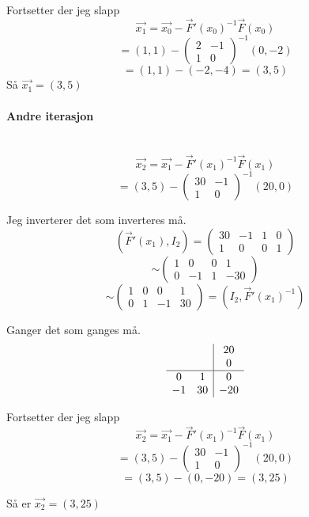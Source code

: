 Fortsetter der jeg slapp
$$\vec{x_1} = \vec{x_0} - \vec{F}'(x_0)^{-1}\vec{F}(x_0)$$
$$ = (1,1) - \begin{pmatrix}2&-1\\1&0\end{pmatrix}^{-1} (0,-2)$$
$$ = (1,1) - (-2,-4) = (3,5)$$
Så $\vec{x_1} = (3,5)$



\paragraph{Andre iterasjon} \mbox{} \\
$$\vec{x_2} = \vec{x_1} - \vec{F}'(x_1)^{-1}\vec{F}(x_1)$$
$$= (3,5) - \begin{pmatrix}30&-1\\1&0\end{pmatrix}^{-1}(20,0)$$

Jeg inverterer det som inverteres må.
$$(\vec{F}'(x_1),I_2) = \begin{pmatrix}30&-1&1&0\\1&0&0&1\end{pmatrix}$$
$$\sim \begin{pmatrix}1&0&0&1\\0&-1&1&-30\end{pmatrix}$$
$$\sim \begin{pmatrix}1&0&0&1\\0&1&-1&30\end{pmatrix}
  = (I_2,\vec{F}'(x_1)^{-1})$$

Ganger det som ganges må.
$$\begin{array}{c c|c}
     &    &  20 \\
     &    &   0 \\
  \hline
   0 &  1 &   0 \\
  -1 & 30 & -20
  \end{array}$$

Fortsetter der jeg slapp
$$\vec{x_2} = \vec{x_1} - \vec{F}'(x_1)^{-1}\vec{F}(x_1)$$
$$= (3,5) - \begin{pmatrix}30&-1\\1&0\end{pmatrix}^{-1}(20,0)$$
$$= (3,5) - (0,-20) = (3,25)$$

Så er $\vec{x_2} = (3, 25)$

